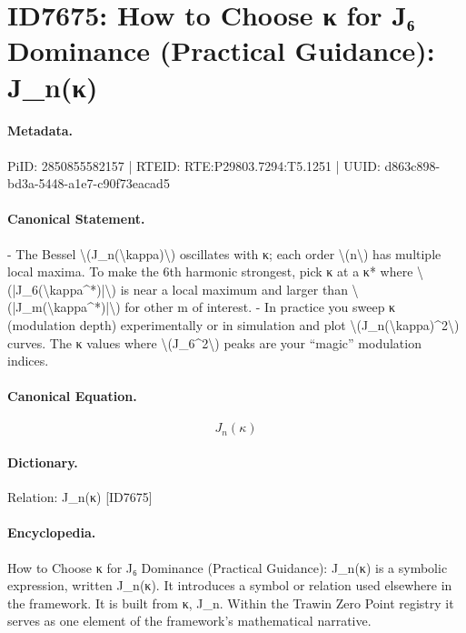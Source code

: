 \section*{ID7675: How to Choose κ for J₆ Dominance (Practical Guidance): J\_n(κ)}
\paragraph{Metadata.}
PiID: 2850855582157 | RTEID: RTE:P29803.7294:T5.1251 | UUID: d863c898-bd3a-5448-a1e7-c90f73eacad5

\paragraph{Canonical Statement.}
- The Bessel \textbackslash{}(J\_n(\textbackslash{}kappa)\textbackslash{}) oscillates with κ; each order \textbackslash{}(n\textbackslash{}) has multiple local maxima. To make the 6th harmonic strongest, pick κ at a κ* where \textbackslash{}(|J\_6(\textbackslash{}kappa\textasciicircum{}*)|\textbackslash{}) is near a local maximum and larger than \textbackslash{}(|J\_m(\textbackslash{}kappa\textasciicircum{}*)|\textbackslash{}) for other m of interest. - In practice you sweep κ (modulation depth) experimentally or in simulation and plot \textbackslash{}(J\_n(\textbackslash{}kappa)\textasciicircum{}2\textbackslash{}) curves. The κ values where \textbackslash{}(J\_6\textasciicircum{}2\textbackslash{}) peaks are your “magic” modulation indices.

\paragraph{Canonical Equation.}
\[
J_n(\kappa)
\]

\paragraph{Dictionary.}
Relation: J\_n(κ) [ID7675]

\paragraph{Encyclopedia.}
How to Choose κ for J₆ Dominance (Practical Guidance): J\_n(κ) is a symbolic expression, written J\_n(κ). It introduces a symbol or relation used elsewhere in the framework. It is built from κ, J\_n. Within the Trawin Zero Point registry it serves as one element of the framework's mathematical narrative.
